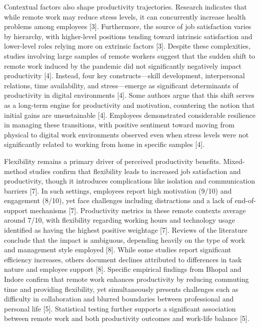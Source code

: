 \documentclass[conference]{IEEEtran}
\begin{document}
Contextual factors also shape productivity trajectories. Research indicates that while remote work may reduce stress levels, it can concurrently increase health problems among employees [3]. Furthermore, the source of job satisfaction varies by hierarchy, with higher-level positions tending toward intrinsic satisfaction and lower-level roles relying more on extrinsic factors [3]. Despite these complexities, studies involving large samples of remote workers suggest that the sudden shift to remote work induced by the pandemic did not significantly negatively impact productivity [4]. Instead, four key constructs—skill development, interpersonal relations, time availability, and stress—emerge as significant determinants of productivity in digital environments [4]. Some authors argue that this shift serves as a long-term engine for productivity and motivation, countering the notion that initial gains are unsustainable [4]. Employees demonstrated considerable resilience in managing these transitions, with positive sentiment toward moving from physical to digital work environments observed even when stress levels were not significantly related to working from home in specific samples [4].

Flexibility remains a primary driver of perceived productivity benefits. Mixed-method studies confirm that flexibility leads to increased job satisfaction and productivity, though it introduces complications like isolation and communication barriers [7]. In such settings, employees report high motivation (9/10) and engagement (8/10), yet face challenges including distractions and a lack of end-of-support mechanisms [7]. Productivity metrics in these remote contexts average around 7/10, with flexibility regarding working hours and technology usage identified as having the highest positive weightage [7]. Reviews of the literature conclude that the impact is ambiguous, depending heavily on the type of work and management style employed [8]. While some studies report significant efficiency increases, others document declines attributed to differences in task nature and employee support [8]. Specific empirical findings from Bhopal and Indore confirm that remote work enhances productivity by reducing commuting time and providing flexibility, yet simultaneously presents challenges such as difficulty in collaboration and blurred boundaries between professional and personal life [5]. Statistical testing further supports a significant association between remote work and both productivity outcomes and work-life balance [5].
\end{document}
